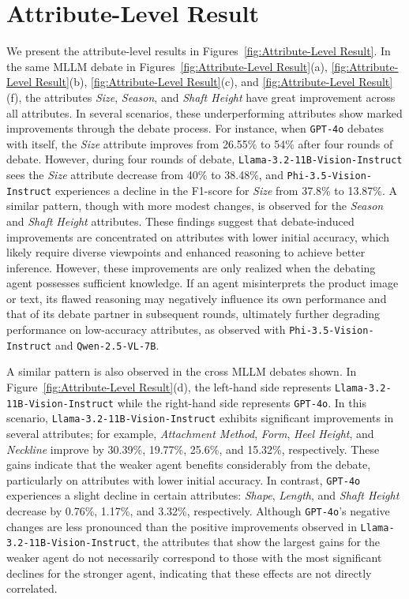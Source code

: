 \documentclass[11pt]{article}
\newcommand{\llamaname}{Llama-3.2-11B-Vision-Instruct}
\newcommand{\Qwenname}{Qwen-2.5-VL-7B}
\newcommand{\phiname}{Phi-3.5-Vision-Instruct}
\begin{document}
\section{Attribute-Level Result}
\label{sec:attribute-level result}
We present the attribute-level results in Figures~\ref{fig:Attribute-Level Result}. In the same MLLM debate in Figures~\ref{fig:Attribute-Level Result}(a), \ref{fig:Attribute-Level Result}(b), \ref{fig:Attribute-Level Result}(c), and \ref{fig:Attribute-Level Result}(f), the attributes \emph{Size}, \emph{Season}, and \emph{Shaft Height} have great improvement across all attributes. In several scenarios, these underperforming attributes show marked improvements through the debate process. For instance, when \texttt{GPT-4o} debates with itself, the \emph{Size} attribute improves from 26.55\% to 54\% after four rounds of debate. However, during four rounds of debate, \texttt{\llamaname} sees the \emph{Size} attribute decrease from 40\% to 38.48\%, and \texttt{\phiname} experiences a decline in the F1-score for \emph{Size} from 37.8\% to 13.87\%. A similar pattern, though with more modest changes, is observed for the \emph{Season} and \emph{Shaft Height} attributes. These findings suggest that debate-induced improvements are concentrated on attributes with lower initial accuracy, which likely require diverse viewpoints and enhanced reasoning to achieve better inference. However, these improvements are only realized when the debating agent possesses sufficient knowledge. If an agent misinterprets the product image or text, its flawed reasoning may negatively influence its own performance and that of its debate partner in subsequent rounds, ultimately further degrading performance on low-accuracy attributes, as observed with \texttt{\phiname} and \texttt{\Qwenname}.

A similar pattern is also observed in the cross MLLM debates shown. In Figure~\ref{fig:Attribute-Level Result}(d), the left-hand side represents \texttt{\llamaname} while the right-hand side represents \texttt{GPT-4o}. In this scenario, \texttt{\llamaname} exhibits significant improvements in several attributes; for example, \emph{Attachment Method}, \emph{Form}, \emph{Heel Height}, and \emph{Neckline} improve by 30.39\%, 19.77\%, 25.6\%, and 15.32\%, respectively. These gains indicate that the weaker agent benefits considerably from the debate, particularly on attributes with lower initial accuracy. In contrast, \texttt{GPT-4o} experiences a slight decline in certain attributes: \emph{Shape}, \emph{Length}, and \emph{Shaft Height} decrease by 0.76\%, 1.17\%, and 3.32\%, respectively. Although \texttt{GPT-4o}'s negative changes are less pronounced than the positive improvements observed in \texttt{\llamaname}, the attributes that show the largest gains for the weaker agent do not necessarily correspond to those with the most significant declines for the stronger agent, indicating that these effects are not directly correlated.
\end{document}
